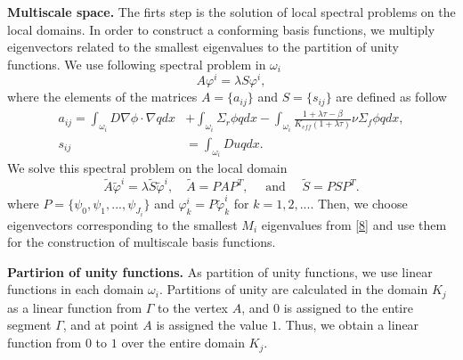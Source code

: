 \documentclass[runningheads]{llncs}
\begin{document}
\textbf{Multiscale space.}
The firts step is the solution of local spectral problems on the local domains.  
In order to construct a conforming basis functions, we multiply eigenvectors related to the smallest eigenvalues to the partition of unity functions.
We use following spectral problem in $\omega_i$
\begin{equation} \label{6}
A \varphi^i = \lambda S \varphi^i,
\end{equation} 
where the elements of the matrices $A= \{ a_{ij} \}$ and $S = \{ s_{ij} \}$ are defined as follow{
\begin{equation} \label{7}
\begin{split}
a_{ij} = 
\int_{\omega_i} D \nabla\phi \cdot \nabla q dx &+ 
\int_{\omega_i} \Sigma_r \phi q dx - 
\int_{\omega_i} \frac{1+\lambda\tau-\beta}{K_{eff}(1+\lambda\tau)} \nu \Sigma_f \phi q dx, \\
s_{ij} &= \int_{\omega _i} D u q dx.
\end{split}
\end{equation}}
We solve this spectral problem on the local domain
\begin{equation} \label{8}
\tilde{A} \tilde{\varphi}^i = \lambda \tilde{S}  \tilde{\varphi}^i, \quad
\tilde{A} = P A P^T, \quad \text{ and } \quad 
\tilde{S} = P S P^T.
\end{equation}
where $P = \{ \psi_0, \psi_1, ...,\psi_{J_i} \}$ and {$\varphi^i_k = P \tilde{\varphi}^i_k$} for $k = 1,2,...$.
{Then, we choose eigenvectors corresponding to the smallest $M_{i}$ eigenvalues from \eqref{8} and use them for the construction of multiscale basis functions.} 

\textbf{Partirion of unity functions. } As  partition of unity functions, we use linear functions in each domain $\omega_i$.
Partitions of unity are calculated in the domain $ K_j $ as a linear function from $\Gamma$ to the vertex $ A $, and $ 0 $ is assigned to the entire segment $\Gamma$, and at point $ A $ is assigned the value $1$. 
Thus, we obtain a linear function from $ 0 $ to $ 1 $ over the entire domain $ K_j $. 
%
 
\end{document}
